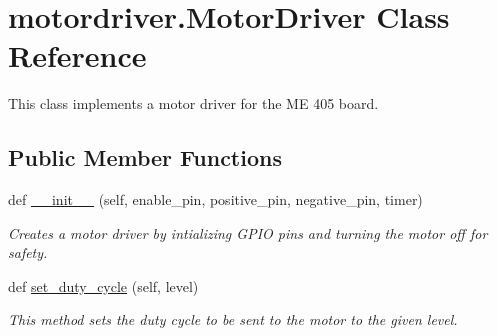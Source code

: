 \hypertarget{classmotordriver_1_1MotorDriver}{}\section{motordriver.\+Motor\+Driver Class Reference}
\label{classmotordriver_1_1MotorDriver}


This class implements a motor driver for the ME 405 board.  


\subsection*{Public Member Functions}
\begin{DoxyCompactItemize}
\item 
def \hyperlink{classmotordriver_1_1MotorDriver_ae59c9da5d21393f3cf44805aa5ed167f}{\+\_\+\+\_\+init\+\_\+\+\_\+} (self, enable\+\_\+pin, positive\+\_\+pin, negative\+\_\+pin, timer)
\begin{DoxyCompactList}\small\item\em Creates a motor driver by intializing G\+P\+IO pins and turning the motor off for safety. \end{DoxyCompactList}\item 
def \hyperlink{classmotordriver_1_1MotorDriver_aaf4bde268698934aea24cf23343bc556}{set\+\_\+duty\+\_\+cycle} (self, level)
\begin{DoxyCompactList}\small\item\em This method sets the duty cycle to be sent to the motor to the given level. \end{DoxyCompactList}\end{DoxyCompactItemize}
